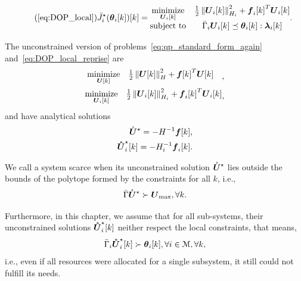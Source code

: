 \documentclass[../main.tex]{subfiles}
\begin{document}
\begin{equation}
  \label{eq:DOP_local_reprise}
  \tag{\ref*{eq:DOP_local}}
  \eqoptobji(\thetaik)[k]=
  \begin{matrix}
    \minimize\limits_{\vec{U}_{i}[k]}&\frac{1}{2}\norm{\vec{U}_{i}[k]}^{2}_{H_{i}} + {\vec{f}_{i}[k]}^{T}\vec{U}_{i}[k]\\
    \mathrm{subject~ to} & \bar{\Gamma}_{i}\vec{U}_{i}[k] \preceq \thetaik:\lambdaik
  \end{matrix}.
\end{equation}

The unconstrained version of problems~\eqref{eq:qp_standard_form_again} and~\eqref{eq:DOP_local_reprise} are
\begin{align}
  \label{eq:qp_standard_form_unconstrained}
  \begin{aligned}
    \begin{matrix}
      \mathop{\textrm{minimize}}\limits_{\boldsymbol{U}[k]} &
                                                 \frac{1}{2}\left\lVert\boldsymbol{U}[k]\right\rVert^{2}_{H} + {\boldsymbol{f}[k]}^{T}\boldsymbol{U}[k] &\\
    \end{matrix},
  \end{aligned}\\
  \label{eq:DOP_local_unconstrained}
  \begin{aligned}
    \begin{matrix}
    \mathop{\textrm{minimize}}\limits_{\boldsymbol{U}_{i}[k]}&\frac{1}{2}\left\lVert\boldsymbol{U}_{i}[k]\right\rVert^{2}_{H_{i}} + {\boldsymbol{f}_{i}[k]}^{T}\boldsymbol{U}_{i}[k]\\
    \end{matrix},
  \end{aligned}
\end{align}
and have analytical solutions~\cite{BoydVandenberghe2004}
\begin{align}
  \label{eq:qp_standard_form_unconstrained_solution}
  \optuncU=-H^{-1}\vec{f}[k],\\
  \label{eq:DOP_local_unconstrained_solution}
  \optuncUik=-H_{i}^{-1}\vec{f}_{i}[k].
\end{align}

We call a system scarce when its unconstrained solution ${\mathring{\boldsymbol{U}}^{\star}}$ lies outside the bounds of the polytope formed by the constraints for all $k$, i.e.,
\begin{equation}
\bar{\Gamma}{\mathring{\boldsymbol{U}}^{\star}}\succ {\boldsymbol{U}}_{\text{max}}, \forall k.
\end{equation}

Furthermore, in this chapter, we assume that for all sub-systems, their unconstrained solutions $\optuncUik$ neither respect the local constraints, that means,
\begin{equation}
\bar{\Gamma}_{i}\optuncUik\succ \thetaik, \forall i\in\set{M}, \forall k,
\end{equation}
i.e., even if all resources were allocated for a single subsystem, it still could not fulfill its needs.
\end{document}
